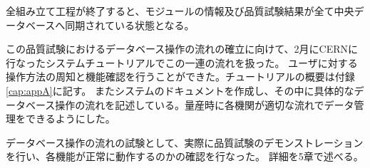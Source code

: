 全組み立て工程が終了すると、モジュールの情報及び品質試験結果が全て中央データベースへ同期されている状態となる。


この品質試験におけるデータベース操作の流れの確立に向けて、2月にCERNに行なったシステムチュートリアルでこの一連の流れを扱った。
ユーザに対する操作方法の周知と機能確認を行うことができた。チュートリアルの概要は付録\ref{cap:appA}に記す。
またシステムのドキュメント\cite{4-7}を作成し、その中に具体的なデータベース操作の流れを記述している。量産時に各機関が適切な流れでデータ管理をできるようにした。


データベース操作の流れの試験として、実際に品質試験のデモンストレーションを行い、各機能が正常に動作するのかの確認を行なった。
詳細を5章で述べる。

